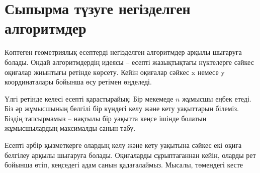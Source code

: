 \chapter{Сыпырма түзуге негізделген алгоритмдер}


Көптеген геометриялық есептерді 
 негізделген алгоритмдер 
арқылы шығаруға болады. Ондай алгоритмдердің идеясы --
есепті жазықтықтағы нүктелерге сәйкес оқиғалар жиынтығы ретінде
көрсету. Кейін оқиғалар сәйкес x немесе y координаталары бойынша 
өсу ретімен өңделеді. 


Үлгі ретінде келесі есепті қарастырайық:
Бір мекемеде $n$ жұмысшы еңбек етеді. Біз 
әр жұмысшының белгілі бір күндегі келу және кету 
уақыттарын білеміз. Біздің тапсырмамыз -- 
нақтылы бір уақытта кеңсе ішінде болатын жұмысшылардың максималды 
санын табу.  


Есепті әрбір қызметкерге олардың келу және кету уақытына сәйкес екі оқиға 
белгілеу арқылы шығаруға болады.
Оқиғаларды сұрыптағаннан кейін, оларды рет бойынша өтіп,
кеңседегі адам санын қадағалаймыз.
Мысалы, төмендегі кесте

